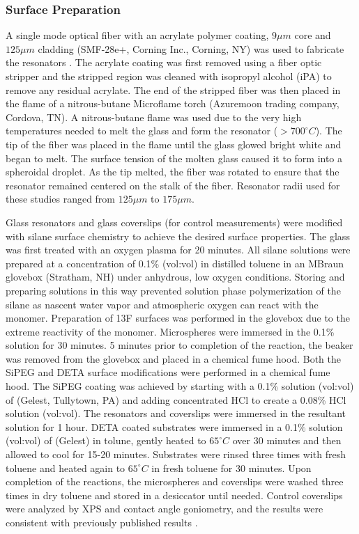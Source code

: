\subsubsection{Surface Preparation}

A single mode optical fiber with an acrylate polymer coating, $9\mu m$
core and $125\mu m$ cladding (SMF-28e+, Corning Inc., Corning, NY)
was used to fabricate the resonators \cite{Vollmer2002}. The acrylate
coating was first removed using a fiber optic stripper and the stripped
region was cleaned with isopropyl alcohol (iPA) to remove any residual
acrylate. The end of the stripped fiber was then placed in the flame
of a nitrous-butane Microflame torch (Azuremoon trading company, Cordova,
TN). A nitrous-butane flame was used due to the very high temperatures
needed to melt the glass and form the resonator ($>700^{\circ}C$).
The tip of the fiber was placed in the flame until the glass glowed
bright white and began to melt. The surface tension of the molten
glass caused it to form into a spheroidal droplet. As the tip melted,
the fiber was rotated to ensure that the resonator remained centered
on the stalk of the fiber. Resonator radii used for these studies
ranged from $125\mu m$ to $175\mu m$.

Glass resonators and glass coverslips (for control measurements) were
modified with silane surface chemistry to achieve the desired surface
properties. The glass was first treated with an oxygen plasma for
20 minutes. All silane solutions were prepared at a concentration
of 0.1\% (vol:vol) in distilled toluene in an MBraun glovebox (Stratham,
NH) under anhydrous, low oxygen conditions. Storing and preparing
solutions in this way prevented solution phase polymerization of the
silane as nascent water vapor and atmospheric oxygen can react with
the monomer. Preparation of 13F surfaces was performed in the glovebox
due to the extreme reactivity of the monomer. Microspheres were immersed
in the 0.1\% 
solution for 30 minutes. 5 minutes prior to completion of the reaction,
the beaker was removed from the glovebox and placed in a chemical
fume hood. Both the SiPEG and DETA surface modifications were performed
in a chemical fume hood. The SiPEG coating was achieved by starting
with a 0.1\% solution (vol:vol) of 
(Gelest, Tullytown, PA) and adding concentrated HCl to create a 0.08\%
HCl solution (vol:vol). The resonators and coverslips were immersed
in the resultant solution for 1 hour. DETA coated substrates were
immersed in a 0.1\% solution (vol:vol) of 
(Gelest) in tolune, gently heated to $65^{\circ}C$ over 30 minutes
and then allowed to cool for 15-20 minutes. Substrates were rinsed
three times with fresh toluene and heated again to $65^{\circ}C$
in fresh toluene for 30 minutes. Upon completion of the reactions,
the microspheres and coverslips were washed three times in dry toluene
and stored in a desiccator until needed. Control coverslips were analyzed
by XPS and contact angle goniometry, and the results were consistent
with previously published results \cite{Wilson2011a}.


